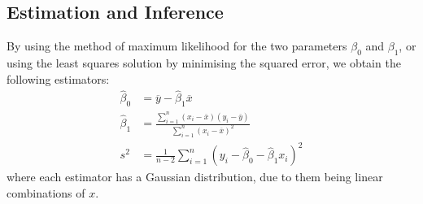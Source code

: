 \documentclass{article}
\begin{document}
\subsection{Estimation and Inference}
By using the method of maximum likelihood for the two parameters \(\beta_0\) and \(\beta_1\), or using the least squares solution by minimising the
squared error, we obtain the following estimators:
\begin{align*}
    \hat{\beta}_0 & = \overline{y} - \hat{\beta}_1 \overline{x}                                                                                                     \\
    \hat{\beta}_1 & = \frac{\sum_{i = 1}^n \left( x_i - \overline{x} \right) \left( y_i - \overline{y} \right)}{\sum_{i = 1}^n \left( x_i - \overline{x} \right)^2} \\
    s^2           & = \frac{1}{n - 2} \sum_{i = 1}^n \left( y_i - \hat{\beta}_0 - \hat{\beta}_1 x_i \right)^2
\end{align*}
where each estimator has a Gaussian distribution, due to them being linear combinations of \(x\).
\end{document}
